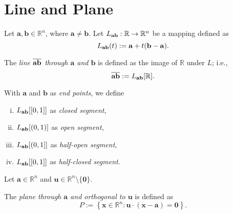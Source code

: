 


\section{Line and Plane}


\begin{definition}
	\label{def: line}
	Let $\mathbf a, \mathbf b \in \mathbb R^n$, where $\mathbf a \ne \mathbf b$. Let $L_{\bf ab}: \mathbb R \to \mathbb R^n$ be a mapping defined as
	$$
	L_{\bf ab}(t) := \mathbf a + t(\mathbf b - \mathbf a).
	$$
	
	The \textit{line $\overline{\bf ab}$ through $\mathbf a$ and $\mathbf b$} is defined as the image of $\mathbb R$ under $L$; i.e.,
	$$
	\overline{\bf ab} := L_{\bf ab}[\mathbb R].
	$$
	
	With $\mathbf a$ and $\mathbf b$ as \textit{end points}, we define
	\begin{enumerate}[(i)]
		\item $L_{\bf ab}[[0,1]]$ as \textit{closed segment},
		\item $L_{\bf ab}[(0,1)]$ as \textit{open segment},
		\item $L_{\bf ab}[(0,1]]$ as \textit{half-open segment},
		\item $L_{\bf ab}[[0,1]]$ as \textit{half-closed segment}.
	\end{enumerate}
\end{definition}


\begin{definition}
	\label{def: plane}
	Let $\mathbf a \in \mathbb R^n$ and $\mathbf u \in \mathbb R^n \setminus \{\mathbf 0\}$.
	
	The \textit{plane through $\mathbf a$ and orthogonal to $\mathbf u$} is defined as
	$$
	P:= \left\{ \mathbf x \in \mathbb R^n : \mathbf u \cdot (\mathbf x - \mathbf a) = \mathbf 0 \right\}.
	$$
\end{definition}










































%